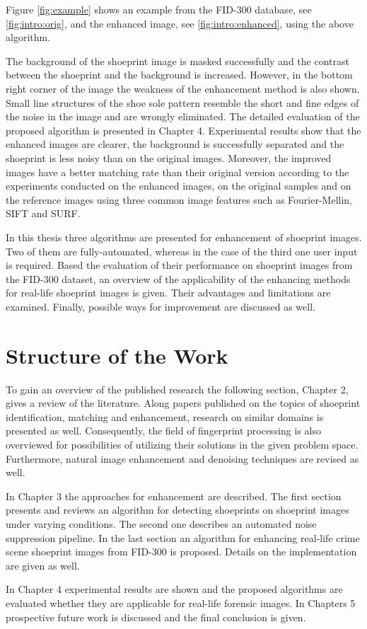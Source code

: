 \documentclass[draft,final]{vutinfth} %
\begin{document}
Figure \ref{fig:example} shows an example from the FID-300 database, see \ref{fig:intro:orig}, and the enhanced image, see \ref{fig:intro:enhanced}, using the above algorithm.
\par
The background of the shoeprint image is masked successfully and the contrast between the shoeprint and the background is increased.
However, in the bottom right corner of the image the weakness of the enhancement method is also shown.
Small line structures of the shoe sole pattern resemble the short and fine edges of the noise in the image and are wrongly eliminated.
The detailed evaluation of the proposed algorithm is presented in Chapter 4.
Experimental results show that the enhanced images are clearer, the background is successfully separated and the shoeprint is less noisy than on the original images.
Moreover, the improved images have a better matching rate than their original version according to the experiments conducted on the enhanced images, on the original samples and on the reference images using three common image features such as Fourier-Mellin, SIFT and SURF.
\par
In this thesis three algorithms are presented for enhancement of shoeprint images.
Two of them are fully-automated, whereas in the case of the third one user input is required.
Based the evaluation of their performance on shoeprint images from the FID-300 dataset, an overview of the applicability of the enhancing methods for real-life shoeprint images is given.
Their advantages and limitations are examined.
Finally, possible ways for improvement are discussed as well.

\section{Structure of the Work}
\par
To gain an overview of the published research the following section, Chapter 2, gives a review of the literature. 
Along papers published on the topics of shoeprint identification, matching and enhancement, research on similar domains is presented as well.
Consequently, the field of fingerprint processing is also overviewed for possibilities of utilizing their solutions in the given problem space.
Furthermore, natural image enhancement and denoising techniques are revised as well.
\par
In Chapter 3 the approaches for enhancement are described.
The first section presents and reviews an algorithm for detecting shoeprints on shoeprint images under varying conditions.
The second one describes an automated noise suppression pipeline.
In the last section an algorithm for enhancing real-life crime scene shoeprint images from FID-300 is proposed.
Details on the implementation are given as well.
\par
In Chapter 4 experimental results are shown and the proposed algorithms are evaluated whether they are applicable for real-life forensic images.
In Chapters 5 prospective future work is discussed and the final conclusion is given. 
\end{document}
